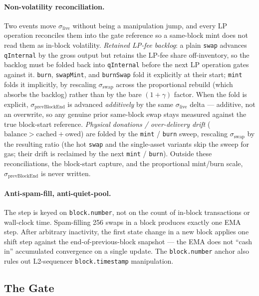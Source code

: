 \documentclass[11pt]{article}
\begin{document}
\paragraph{Non-volatility reconciliation.}
Two events move $\sigma_{\mathrm{live}}$ without being a manipulation
jump, and every LP operation reconciles them into the gate reference so
a same-block mint does not read them as in-block volatility.
\emph{Retained LP-fee backlog}: a plain \texttt{swap} advances
\texttt{qInternal} by the gross output but retains the LP-fee share
off-inventory, so the backlog must be folded back into \texttt{qInternal}
before the next LP operation gates against it. \texttt{burn},
\texttt{swapMint}, and \texttt{burnSwap} fold it explicitly at their
start; \texttt{mint} folds it implicitly, by rescaling
$\sigma_{\mathrm{swap}}$ across the proportional rebuild (which absorbs
the backlog) rather than by the bare $(1 + \gamma)$ factor. When the
fold is explicit, $\sigma_{\mathrm{prevBlockEnd}}$ is advanced
\emph{additively} by the same $\sigma_{\mathrm{live}}$ delta --- additive,
not an overwrite, so any genuine prior same-block swap stays measured
against the true block-start reference. \emph{Physical donations /
over-delivery drift} ($\mathrm{balance} > \mathrm{cached} + \mathrm{owed}$)
are folded by the \texttt{mint} / \texttt{burn} sweep, rescaling
$\sigma_{\mathrm{swap}}$ by the resulting ratio (the hot \texttt{swap}
and the single-asset variants skip the sweep for gas; their drift is
reclaimed by the next \texttt{mint} / \texttt{burn}). Outside these
reconciliations, the block-start capture, and the proportional mint/burn
scale, $\sigma_{\mathrm{prevBlockEnd}}$ is never written.

\paragraph{Anti-spam-fill, anti-quiet-pool.}
The step is keyed on \texttt{block.number}, not on the count of
in-block transactions or wall-clock time. Spam-filling 256 swaps in a
block produces exactly one EMA step. After arbitrary inactivity, the
first state change in a new block applies one shift step against the
end-of-previous-block snapshot --- the EMA does not ``cash in''
accumulated convergence on a single update. The
\texttt{block.number} anchor also rules out L2-sequencer
\texttt{block.timestamp} manipulation.

\subsection{The Gate}
\label{sec:gate}
\end{document}
